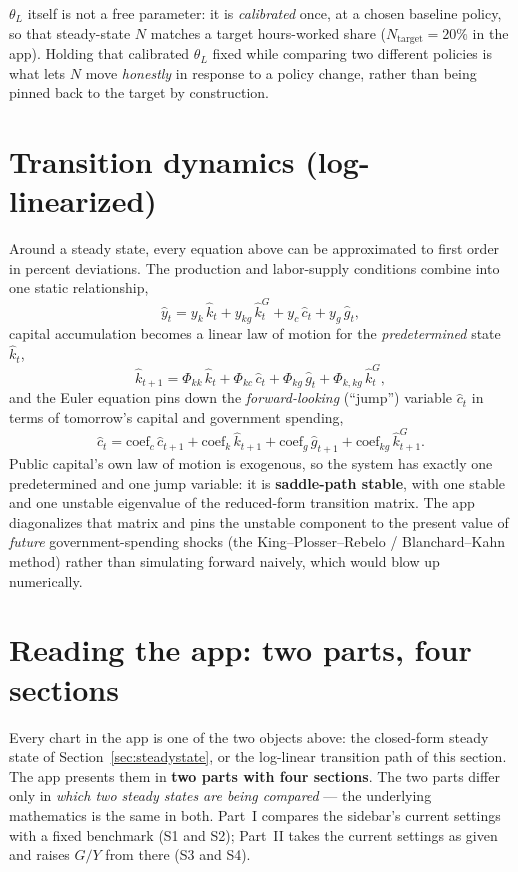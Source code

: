 \documentclass[11pt]{article}
\newcommand{\eq}[1]{\begin{equation}#1\end{equation}}
\begin{document}
$\theta_L$ itself is not a free parameter: it is \emph{calibrated} once, at
a chosen baseline policy, so that steady-state $N$ matches a target
hours-worked share ($N_{\text{target}}=20\%$ in the app). Holding that calibrated $\theta_L$ fixed while comparing two
different policies is what lets $N$ move \emph{honestly} in response to a
policy change, rather than being pinned back to the target by construction.

\section{Transition dynamics (log-linearized)}

Around a steady state, every equation above can be approximated to first
order in percent deviations. The production and labor-supply conditions
combine into one static relationship,
\eq{ \hat y_t = y_k\,\hat k_t + y_{kg}\,\hat{k}^G_t + y_c\,\hat c_t + y_g\,\hat g_t, }
capital accumulation becomes a linear law of motion for the
\emph{predetermined} state $\hat k_t$,
\eq{ \hat k_{t+1} = \Phi_{kk}\,\hat k_t + \Phi_{kc}\,\hat c_t + \Phi_{kg}\,\hat g_t + \Phi_{k,kg}\,\hat{k}^G_t, }
and the Euler equation pins down the \emph{forward-looking} (``jump'')
variable $\hat c_t$ in terms of tomorrow's capital and government spending,
\eq{ \hat c_t = \text{coef}_c\,\hat c_{t+1} + \text{coef}_k\,\hat k_{t+1} + \text{coef}_g\,\hat g_{t+1} + \text{coef}_{kg}\,\hat{k}^G_{t+1}. }
Public capital's own law of motion is exogenous, so the system has exactly
one predetermined and one jump variable: it is \textbf{saddle-path stable},
with one stable and one unstable eigenvalue of the reduced-form transition
matrix. The app diagonalizes that matrix and pins the unstable component to
the present value of \emph{future} government-spending shocks (the
King--Plosser--Rebelo / Blanchard--Kahn method) rather than simulating
forward naively, which would blow up numerically.

\section{Reading the app: two parts, four sections}
\label{sec:panels}

Every chart in the app is one of the two objects above: the closed-form
steady state of Section~\ref{sec:steadystate}, or the log-linear
transition path of this section. The app presents them in \textbf{two
parts with four sections}. The two parts differ only in \emph{which two
steady states are being compared} --- the underlying mathematics is the
same in both. Part~I compares the sidebar's current settings with a fixed
benchmark (S1 and S2); Part~II takes the current settings as given and
raises $G/Y$ from there (S3 and S4).
\end{document}
